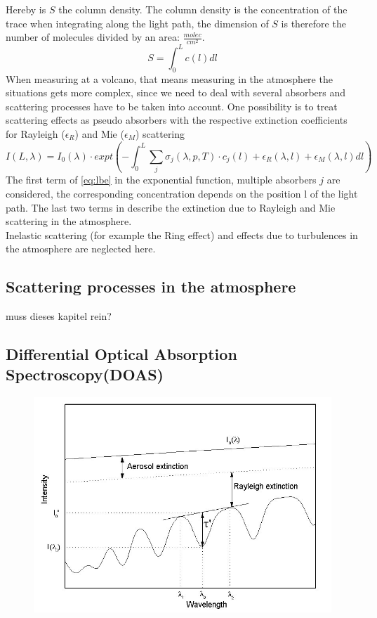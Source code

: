 \documentclass  [
  paper    = a4,
  BCOR     = 10mm,
  twoside,
  fontsize = 12pt,
  fleqn,
  toc      = bibnumbered,
  toc      = listofnumbered,
  numbers  = noendperiod,
  headings = normal,
  listof   = leveldown,
  version  = 3.03
]                                       {scrreprt}
\begin{document}
	Hereby is $S$ the column density. The column density is the concentration of the trace when integrating along the light path, the dimension of $S$ is therefore the number of molecules divided by an area: $\frac{molec}{cm^2}$.
	\begin{equation}
	S = \int_{0}^{L}c\left(l\right)dl
	\end{equation}
	When measuring at a volcano, that means measuring in the atmosphere the situations gets more complex, since we need to deal with several absorbers and scattering processes have to be taken into account. One possibility is to treat scattering effects as pseudo absorbers with the respective extinction coefficients for Rayleigh ($\epsilon_R$) and  Mie ($\epsilon_M$) scattering
	\begin{equation}
	I\left(L,\lambda\right) = I_{0}\left(\lambda\right)\cdot expt\left(-\int^{L}_{0}\sum_{j}\sigma_{j}\left(\lambda,p,T\right)\cdot
	c_{j}\left(l\right)+\epsilon_R\left(\lambda,l\right)+\epsilon_{M}\left(\lambda,l\right)dl\right)
	\label{eq:lbe}
	\end{equation}
	The first term of \cref{eq:lbe} in the exponential function, multiple absorbers $j$ are considered, the corresponding concentration depends on the position l of the light path.
	The last two terms in describe the extinction due to Rayleigh and Mie scattering in the atmosphere.\\
	Inelastic scattering (for example the Ring effect) and effects due to turbulences in the atmosphere are neglected here.
	
	\subsection{Scattering processes in the atmosphere}
	muss dieses kapitel rein?

	\subsection{Differential Optical Absorption Spectroscopy(DOAS)\label{DOAS}}
		\begin{figure}
			\centering
			\includegraphics[width=0.7\linewidth]{Bilder/Simon/Bilder_Tung/DOAS_Intensity}
			\caption{}
			\label{fig:doasintensity}
		\end{figure}
		
\end{document}
